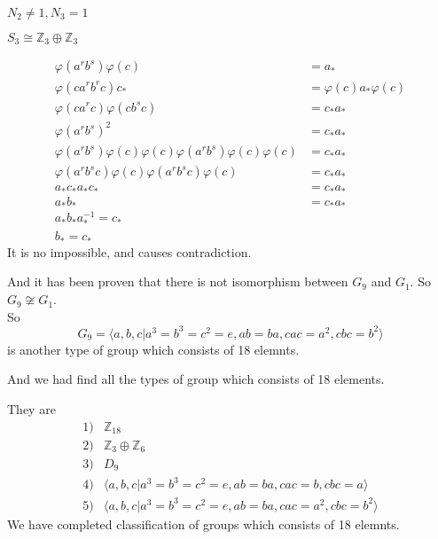 \documentclass[a4paper,14pt]{article}
\begin{document}
\begin{enumerate}
\begin{item}{$N_2 \neq 1, N_3 = 1$}
\begin{enumerate}
\begin{item}{$S_3\cong \mathbb{Z}_3 \oplus \mathbb{Z}_3$}
\begin{enumerate}
\begin{enumerate}
\begin{align*}
                                        \varphi(a^rb^s)\varphi(c) &= a_*\\
                                        \varphi(ca^rb^rc)c_* &= \varphi(c)a_*\varphi(c)\\
                                        \varphi(ca^rc)\varphi(cb^sc) &= c_*a_*\\
                                        \varphi(a^rb^s)^2 &= c_*a_* \\
                                        \varphi(a^rb^s)\varphi(c)\varphi(c)\varphi(a^rb^s)\varphi(c)\varphi(c) &= c_*a_*\\
                                        \varphi(a^rb^sc)\varphi(c)\varphi(a^rb^sc)\varphi(c) &= c_*a_*\\
                                        a_*c_*a_*c_* &= c_*a_*\\
                                        a_*b_* &= c_*a_*\\
                                        a_*b_*a_*^{-1} = c_*\\
                                        b_* = c_*
                                    \end{align*}
                                    It is no impossible, and causes contradiction.
                            \end{enumerate}
                            And it has been proven that there is not isomorphism between $G_9$ and $G_1$. So $G_9 \not \cong G_1$.\\
                            So
                            $$
                            G_9 = \langle a,b,c|a^3=b^3=c^2=e,ab=ba,cac=a^2,cbc=b^2\rangle
                            $$
                            is another type of group which consists of 18 elemnts.
                     \end{enumerate}
                \end{item}
                And we had find all the types of group which consists of 18 elements.
            \end{enumerate}
        \end{item}
    \end{enumerate}
    They are 
    \begin{align*}
        1)& \mathbb{Z}_{18}\\
        2)& \mathbb{Z}_3\oplus \mathbb{Z}_6\\
        3)& D_9\\
        4)& \langle a,b,c|a^3=b^3=c^2=e,ab=ba,cac=b,cbc=a\rangle\\
        5)& \langle a,b,c|a^3=b^3=c^2=e,ab=ba,cac=a^2,cbc=b^2\rangle
    \end{align*}
    We have completed classification of groups which consists of 18 elemnts.
\end{document}
